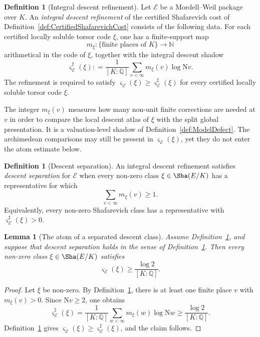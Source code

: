 \documentclass[10pt, reqno]{amsart}
\theoremstyle{plain}
\newtheorem{lemma}[theorem]{Lemma}
\theoremstyle{definition}
\newtheorem{definition}[theorem]{Definition}
\theoremstyle{plain}
\newcommand{\Q}{\mathbb{Q}}
\newcommand{\coloneqq}{\mathrel{\mathop:}=}
\begin{document}
\begin{definition}[Integral descent refinement]
\label{def:IntegralDescentRefinement}
Let $\mathcal{E}$ be a Mordell--Weil package over $K$. An \emph{integral descent refinement} of the certified Shafarevich cost of Definition~\ref{def:CertifiedShafarevichCost} consists of the following data. For each certified locally soluble torsor code $\xi$, one has a finite-support map
\[
  m_{\xi}\colon \{\text{finite places of }K\}\longrightarrow \mathbb{N}
\]
arithmetical in the code of $\xi$, together with the integral descent shadow
\[
  \varsigma^{\sharp}_{\mathcal{E}}(\xi)
  \coloneqq
  \frac{1}{[K:\Q]}
  \sum_{v<\infty} m_{\xi}(v)\log \mathrm{N}v.
\]
The refinement is required to satisfy $\varsigma_{\mathcal{E}}(\xi)\ge\varsigma^{\sharp}_{\mathcal{E}}(\xi)$ for every certified locally soluble torsor code $\xi$.
\end{definition}

The integer $m_{\xi}(v)$ measures how many non-unit finite corrections are needed at $v$ in order to compare the local descent atlas of $\xi$ with the split global presentation. It is a valuation-level shadow of Definition~\ref{def:ModelDefect}. The archimedean comparisons may still be present in $\varsigma_{\mathcal{E}}(\xi)$, yet they do not enter the atom estimate below.

\begin{definition}[Descent separation]
\label{def:DescentSeparation}
An integral descent refinement satisfies \emph{descent separation} for $\mathcal{E}$ when every non-zero class $\xi\in\Sha(E/K)$ has a representative for which
\[
  \sum_{v<\infty} m_{\xi}(v) \ge 1.
\]
Equivalently, every non-zero Shafarevich class has a representative with $\varsigma^{\sharp}_{\mathcal{E}}(\xi)>0$.
\end{definition}

\begin{lemma}[The atom of a separated descent class]
\label{lem:SeparatedDescentAtom}
Assume Definition~\ref{def:IntegralDescentRefinement}, and suppose that descent separation holds in the sense of Definition~\ref{def:DescentSeparation}. Then every non-zero class $\xi\in\Sha(E/K)$ satisfies
\[
  \varsigma_{\mathcal{E}}(\xi)
  \ge
  \frac{\log 2}{[K:\Q]}.
\]
\end{lemma}

\begin{proof}
Let $\xi$ be non-zero. By Definition~\ref{def:DescentSeparation}, there is at least one finite place $v$ with $m_{\xi}(v)>0$. Since $\mathrm{N}v\ge 2$, one obtains
\[
  \varsigma^{\sharp}_{\mathcal{E}}(\xi)
  =
  \frac{1}{[K:\Q]}
  \sum_{w<\infty} m_{\xi}(w)\log \mathrm{N}w
  \ge
  \frac{\log 2}{[K:\Q]}.
\]
Definition~\ref{def:IntegralDescentRefinement} gives $\varsigma_{\mathcal{E}}(\xi)\ge\varsigma^{\sharp}_{\mathcal{E}}(\xi)$, and the claim follows.
\end{proof}
\end{document}
